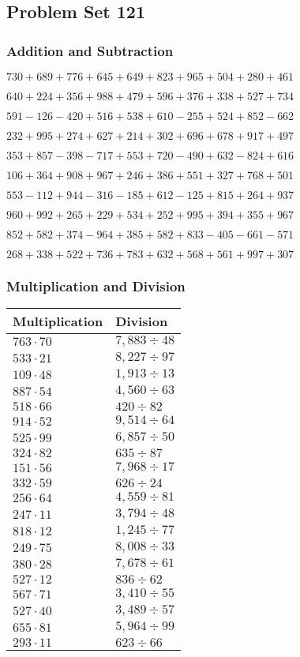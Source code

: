 \hypertarget{problem-set-121}{%
\subsection{Problem Set 121}\label{problem-set-121}}

\hypertarget{addition-and-subtraction}{%
\subsubsection{Addition and
Subtraction}\label{addition-and-subtraction}}

\(730 +689 +776 +645 +649 +823 +965 +504 +280 +461\)

\(640 +224 +356 +988 +479 +596 +376 +338 +527 +734\)

\(591 - 126 - 420 +516 +538 +610 - 255 +524 +852 - 662\)

\(232 +995 +274 +627 +214 +302 +696 +678 +917 +497\)

\(353 +857 - 398 - 717 +553 +720 - 490 +632 - 824 +616\)

\(106 +364 +908 +967 +246 +386 +551 +327 +768 +501\)

\(553 - 112 +944 - 316 - 185 +612 - 125 +815 +264 +937\)

\(960 +992 +265 +229 +534 +252 +995 +394 +355 +967\)

\(852 +582 +374 - 964 +385 +582 +833 - 405 - 661 - 571\)

\(268 +338 +522 +736 +783 +632 +568 +561 +997 +307\)

\hypertarget{multiplication-and-division}{%
\subsubsection{Multiplication and
Division}\label{multiplication-and-division}}

\begin{longtable}[]{@{}ll@{}}
\toprule
Multiplication & Division\tabularnewline
\midrule
\endhead
\(763 \cdot 70\) & \(7,883÷48\)\tabularnewline
\(533 \cdot 21\) & \(8,227÷97\)\tabularnewline
\(109 \cdot 48\) & \(1,913÷13\)\tabularnewline
\(887 \cdot 54\) & \(4,560÷63\)\tabularnewline
\(518 \cdot 66\) & \(420÷82\)\tabularnewline
\(914 \cdot 52\) & \(9,514÷64\)\tabularnewline
\(525 \cdot 99\) & \(6,857÷50\)\tabularnewline
\(324 \cdot 82\) & \(635÷87\)\tabularnewline
\(151 \cdot 56\) & \(7,968÷17\)\tabularnewline
\(332 \cdot 59\) & \(626÷24\)\tabularnewline
\(256 \cdot 64\) & \(4,559÷81\)\tabularnewline
\(247 \cdot 11\) & \(3,794÷48\)\tabularnewline
\(818 \cdot 12\) & \(1,245÷77\)\tabularnewline
\(249 \cdot 75\) & \(8,008÷33\)\tabularnewline
\(380 \cdot 28\) & \(7,678÷61\)\tabularnewline
\(527 \cdot 12\) & \(836÷62\)\tabularnewline
\(567 \cdot 71\) & \(3,410÷55\)\tabularnewline
\(527 \cdot 40\) & \(3,489÷57\)\tabularnewline
\(655 \cdot 81\) & \(5,964÷99\)\tabularnewline
\(293 \cdot 11\) & \(623÷66\)\tabularnewline
\bottomrule
\end{longtable}
